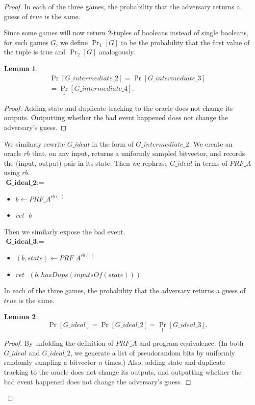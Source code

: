 \documentclass[12pt,lot, lof]{puthesis}
\newenvironment{game}
{ \begin{itemize}[noitemsep,nolistsep] 
}
{ \end{itemize}                  }
\newcommand{\s} {\textrm{ }}
\newtheorem{lem}{Lemma}[thm]
\begin{document}
\begin{proof}
In each of the three games, the probability that the adversary returns a guess of $true$ is the same.

Since some games will now return 2-tuples of booleans instead of single booleans, for such games $G$, we define $\Pr_1[G]$ to be the probability that the first value of the tuple is true and $\Pr_2[G]$ analogously.

\begin{lem} \begin{gather*}\Pr[G\_intermediate\_2] = \Pr[G\_intermediate\_3] \\ 
= \Pr_1[G\_intermediate\_4].\end{gather*} \end{lem}
\begin{proof}Adding state and duplicate tracking to the oracle does not change its outputs. Outputting whether the bad event happened does not change the adversary's guess. \end{proof}

We similarly rewrite $G\_ideal$ in the form of $G\_intermediate\_2$. We create an oracle $rb$ that, on any input, returns a uniformly sampled bitvector, and records the (input, output) pair in its state. Then we rephrase $G\_ideal$ in terms of $PRF\_A$ using $rb$.\\

$\textbf{G\_ideal\_2} := $
\begin{game}
\item[] $b \leftarrow PRF\_A^{rb(\cdot)}$ 
\item[] $ret \s b$ \\
\end{game}

Then we similarly expose the bad event.\\

$\textbf{G\_ideal\_3} := $
\begin{game}
\item[] $(b, state) \leftarrow PRF\_A^{rb(\cdot)}$ 
\item[] $ret \s (b, hasDups(inputsOf(state)))$ \\
\end{game}

In each of the three games, the probability that the adversary returns a guess of $true$ is the same.

\begin{lem}$$\Pr[G\_ideal] = \Pr[G\_ideal\_2] = \Pr_1[G\_ideal\_3].$$\end{lem}
\begin{proof}By unfolding the definition of $PRF\_A$ and program equivalence. (In both $G\_ideal$ and $G\_ideal\_2$, we generate a list of pseudorandom bits by uniformly randomly sampling a bitvector $n$ times.) Also, adding state and duplicate tracking to the oracle does not change its outputs, and outputting whether the bad event happened does not change the adversary's guess. \end{proof}


\end{proof}
\end{document}
